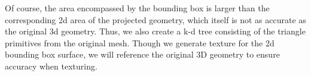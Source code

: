 \message{ !name(masters.tex)}\documentclass[]{spie}  %
\begin{document}
Of course, the area encompassed by the bounding box is larger than the
corresponding 2d area of the projected geometry, which itself is not
as accurate as the original 3d geometry. Thus, we also create a k-d
tree consisting of the triangle primitives from the original
mesh. Though we generate texture for the 2d bounding box surface, we
will reference the original 3D geometry to ensure accuracy when
texturing.

\end{document}
